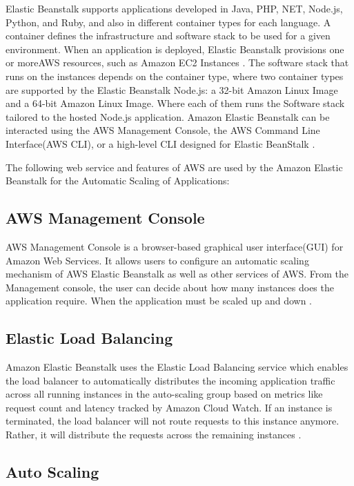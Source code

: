 \documentclass[9pt,twocolumn,twoside]{../../styles/osajnl}
\begin{document}
Elastic Beanstalk supports applications developed in Java, PHP, NET,
Node.js, Python, and Ruby, and also in different container types for
each language. A container defines the infrastructure and software
stack to be used for a given environment. When an application is
deployed, Elastic Beanstalk provisions one or moreAWS resources, such
as Amazon EC2 Instances \cite{elastic-beanstalk-book}. The software
stack that runs on the instances depends on the container type, where
two container types are supported by the Elastic Beanstalk Node.js: a
32-bit Amazon Linux Image and a 64-bit Amazon Linux Image. Where each
of them runs the Software stack tailored to the hosted Node.js
application. Amazon Elastic Beanstalk can be interacted using the AWS
Management Console, the AWS Command Line Interface(AWS CLI), or a
high-level CLI designed for Elastic BeanStalk
\cite{elastic-beanstalk-book}.

The following web service and features of AWS are used by the Amazon
Elastic Beanstalk for the Automatic Scaling of Applications:

\subsection{AWS Management Console}

AWS Management Console is a browser-based graphical user
interface(GUI) for Amazon Web Services. It allows users to configure
an automatic scaling mechanism of AWS Elastic Beanstalk as well as
other services of AWS. From the Management console, the user can decide
about how many instances does the application require. When the
application must be scaled up and down \cite{elastic-beanstalk}.

\subsection{Elastic Load Balancing}

Amazon Elastic Beanstalk uses the Elastic Load Balancing service which
enables the load balancer to automatically distributes the incoming
application traffic across all running instances in the auto-scaling
group based on metrics like request count and latency tracked by
Amazon Cloud Watch. If an instance is terminated, the load balancer
will not route requests to this instance anymore. Rather, it will
distribute the requests across the remaining instances
\cite{elastic-loadbalancing}.

\subsection{Auto Scaling}
\end{document}
